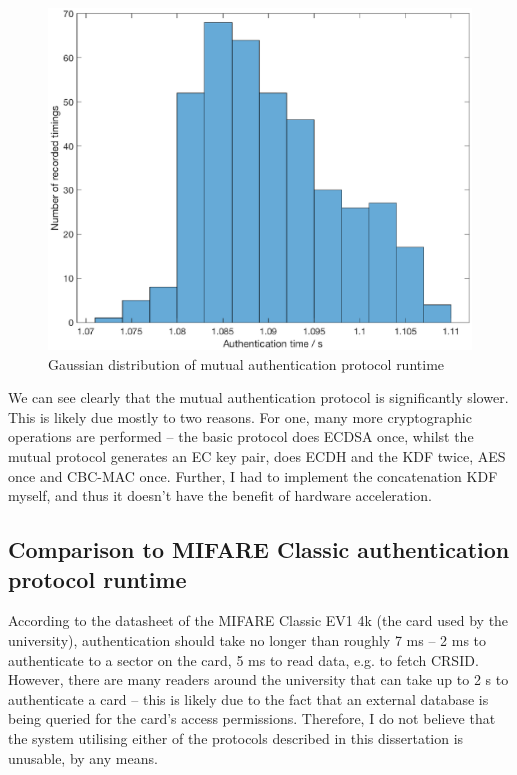 \documentclass[12pt,a4paper,twoside,openright]{report}
\begin{document}
\begin{figure}[tbh]
\centerline{\includegraphics[scale=0.8]{figures/mutualauthplot.eps}}
\caption{Gaussian distribution of mutual authentication protocol runtime}
\label{mutualauthplot}
\end{figure}

We can see clearly that the mutual authentication protocol is significantly slower. This is likely due mostly to two reasons. For one, many more cryptographic operations are performed -- the basic protocol does ECDSA once, whilst the mutual protocol generates an EC key pair, does ECDH and the KDF twice, AES once and CBC-MAC once. Further, I had to implement the concatenation KDF myself, and thus it doesn't have the benefit of hardware acceleration.

\subsection{Comparison to MIFARE Classic authentication protocol runtime}

According to the datasheet of the MIFARE Classic EV1 4k (the card used by the university), authentication should take no longer than roughly 7 ms -- 2 ms to authenticate to a sector on the card, 5 ms to read data, e.g. to fetch CRSID. However, there are many readers around the university that can take up to 2 s to authenticate a card -- this is likely due to the fact that an external database is being queried for the card's access permissions. Therefore, I do not believe that the system utilising either of the protocols described in this dissertation is unusable, by any means.
\end{document}
